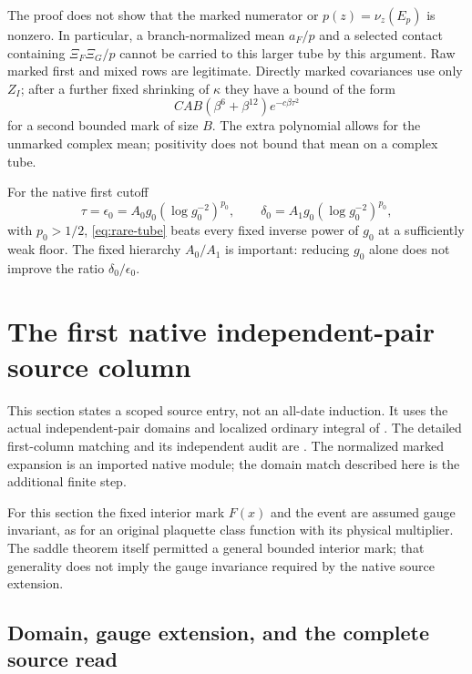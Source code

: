 \begin{remark}
The proof does not show that the marked numerator or $p(z)=\nu_z(E_p)$ is nonzero. In particular, a branch-normalized mean $a_F/p$ and a selected contact containing $\Xi_F\Xi_G/p$ cannot be carried to this larger tube by this argument. Raw marked first and mixed rows are legitimate. Directly marked covariances use only $Z_I$; after a further fixed shrinking of $\kappa$ they have a bound of the form
\[
 C A B(\beta^6+\beta^{12})e^{-c\beta\tau^2}
\]
for a second bounded mark of size $B$. The extra polynomial allows for the unmarked complex mean; positivity does not bound that mean on a complex tube.
\end{remark}

For the native first cutoff
\begin{equation}\label{eq:running-cutoffs}
 \tau=\epsilon_0=A_0g_0(\log g_0^{-2})^{p_0},\qquad
 \delta_0=A_1g_0(\log g_0^{-2})^{p_0},
\end{equation}
with $p_0>1/2$, \eqref{eq:rare-tube} beats every fixed inverse power of $g_0$ at a sufficiently weak floor. The fixed hierarchy $A_0/A_1$ is important: reducing $g_0$ alone does not improve the ratio $\delta_0/\epsilon_0$.

\section{The first native independent-pair source column}
\label{sec:first-column}

This section states a scoped source entry, not an all-date induction. It uses the actual independent-pair domains and localized ordinary integral of \cite{B109,B116,B119}. The detailed first-column matching and its independent audit are . The normalized marked expansion is an imported native module; the domain match described here is the additional finite step.

For this section the fixed interior mark $F(x)$ and the event are assumed gauge invariant, as for an original plaquette class function with its physical multiplier. The saddle theorem itself permitted a general bounded interior mark; that generality does not imply the gauge invariance required by the native source extension.

\subsection{Domain, gauge extension, and the complete source read}


